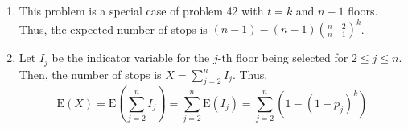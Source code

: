 \begin{enumerate}[label=(\alph*)]
\item This problem is a special case of problem 42 with $t=k$ and $n-1$ floors.
Thus, the expected number of stops is $(n-1) - (n-1)(\frac{n-2}{n-1})^{k}$.

\item Let $I_{j}$ be the indicator variable for the $j$-th floor being selected
for $2 \leq j \leq n$. Then, the number of stops is $X = \sum_{j=2}^{n}I_{j}$.
Thus, $$\text{E}(X) = \text{E}(\sum_{j=2}^{n}I_{j}) = \sum_{j=2}^{n}\text{E}(I_
{j}) = \sum_{j=2}^{n}(1-(1 - p_{j})^{k})$$
\end{enumerate}
